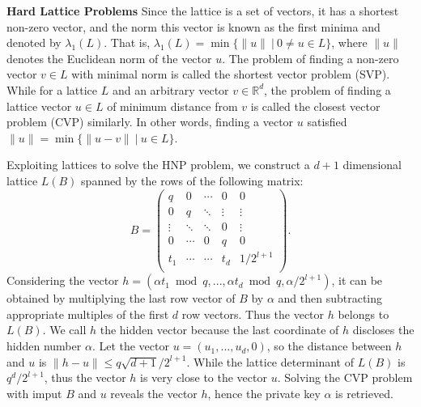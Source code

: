 \noindent\textbf{Hard Lattice Problems} Since the lattice is a set of vectors,
 it has a shortest non-zero vector, and the norm this vector is known as the first minima and denoted by $\lambda_1(L)$.
That is, $\lambda_1(L) = \min\{\|u\| \ |\  0 \neq u \in L\}$, where $\|u\|$ denotes the Euclidean norm of the vector $u$.
The problem of finding a non-zero vector $v \in L$ with minimal norm is called the shortest vector problem (SVP).
 While for a lattice $L$ and an arbitrary vector $v \in \mathbb{R}^d$,
 the problem of finding a lattice vector $u \in L$ of minimum distance from $v$ is called the closest vector problem (CVP) similarly.
  In other words, finding a vector $u$ satisfied $\|u\| = \min\{\|u - v\| \ |\   u \in L\}$.

Exploiting lattices to solve the HNP problem, we construct a $d+1$ dimensional lattice $L(B)$ spanned by the rows of the following matrix:
$$B =
\left(
  \begin{array}{ccccc}
    q & 0 & \cdots & 0 & 0 \\
    0 & q & \ddots & \vdots & \vdots \\
    \vdots & \ddots & \ddots & 0 & \vdots \\
    0 & \cdots & 0 & q & 0 \\
    t_1 & \cdots & \cdots & t_d & 1/2^{l+1} \\
  \end{array}
\right).
$$
Considering the vector $h = (\alpha t_1 \bmod q, ..., \alpha t_d \bmod q, \alpha /2^{l+1})$,
 it can be obtained by multiplying the last row vector of $B$ by $\alpha$ and then subtracting appropriate multiples of the first $d$ row vectors.
Thus the vector $h$ belongs to $L(B)$.
We call $h$ the hidden vector because the last coordinate of $h$ discloses the hidden number $\alpha$.
Let the vector $u = (u_1, ..., u_d, 0)$,
 so the distance between $h$ and $u$ is $\|h - u\| \leq q\sqrt{d+1}/2^{l+1}$.
While the lattice determinant of $L(B)$ is $q^d/2^{l+1}$,
 thus the vector $h$ is very close to the vector $u$.
Solving the CVP problem with imput $B$ and $u$ reveals the vector $h$,
 hence the private key $\alpha$ is retrieved.

